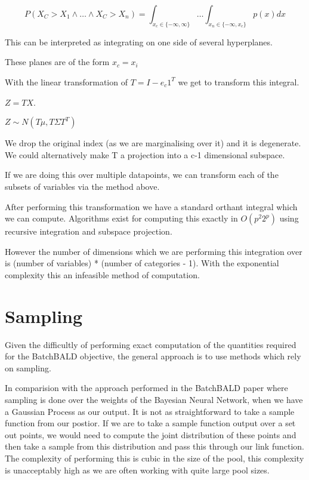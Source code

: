 \documentclass[12pt, a4paper]{report}
\theoremstyle{definition}
\begin{document}
$$P(X_C > X_1 \land \ldots \land X_C > X_n) = \int_{x_c \in \{ -\infty, \infty \} } \ldots \int_{x_n \in \{ -\infty , x_c \}} p(x) dx$$

This can be interpreted as integrating on one side of several hyperplanes.

These planes are of the form $x_c = x_i$

With the linear transformation of $T = I - e_c 1^T$ we get to transform this integral.

$Z = TX$.

$Z \sim N(T \mu, T \Sigma T^T)$

We drop the original index (as we are marginalising over it) and it is degenerate. We could alternatively make T a projection into a c-1 dimensional subspace.

If we are doing this over multiple datapoints, we can transform each of the subsets of variables via the method above.

After performing this transformation we have a standard orthant integral which we can compute. Algorithms exist for computing this exactly in $O(p^2 2^p)$ using recursive integration and subspace projection. \cite{orthant}


However the number of dimensions which we are performing this integration over is (number of variables) * (number of categories - 1). With the exponential complexity this an infeasible method of computation.



\section{Sampling}

Given the difficultly of performing exact computation of the quantities required for the BatchBALD objective, the general approach is to use methods which rely on sampling.

In comparision with the approach performed in the BatchBALD paper where sampling is done over the weights of the Bayesian Neural Network, when we have a Gaussian Process as our output. It is not as straightforward to take a sample function from our postior. If we are to take a sample function output over a set out points, we would need to compute the joint distribution of these points and then take a sample from this distribution and pass this through our link function.
The complexity of performing this is cubic in the size of the pool, this complexity is unacceptably high as we are often working with quite large pool sizes.
\end{document}
